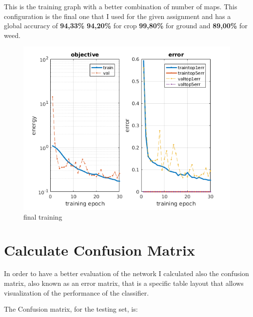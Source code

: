 \documentclass[]{report}
\begin{document}
\newpage   
This is the training graph with a better combination of number of maps. This configuration is the final one that I used for the given assignment and has a global accuracy of \textbf{94,33\%} \textbf{94,20\%} for crop \textbf{99,80\%} for ground and \textbf{89,00\%} for weed.

\begin{figure}[h]
	\begin{center}
		\includegraphics[scale=0.5]{final.png}
		\caption{final training}
		\label{fig:FinalTraining}
	\end{center}
\end{figure}
\newpage

\section{Calculate Confusion Matrix}

In order to have a better evaluation of the network I calculated also the confusion matrix, also known as an error matrix, that is a specific table layout that allows visualization of the performance of the classifier.

The Confusion matrix, for the testing set, is:
\end{document}
